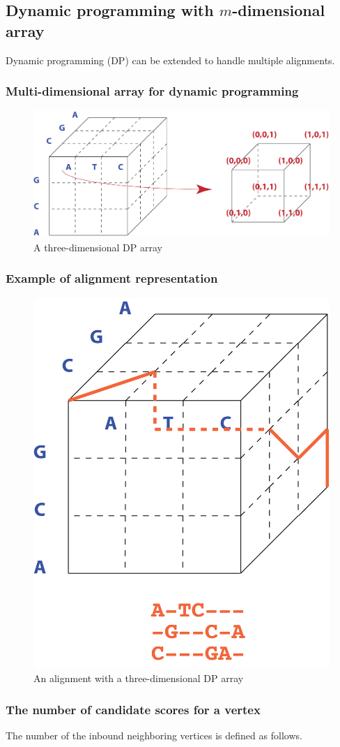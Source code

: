 %
%

%
%
\subsection{Dynamic programming with $m$-dimensional array}
Dynamic programming (DP) can be extended to handle multiple alignments. 

%
%
\subsubsection*{Multi-dimensional array for dynamic programming}
\begin{figure}[H]
  \centering
      \includegraphics[width=0.5 \textwidth]{fig08/dp_mutiple_dimension.png}
  \caption{A three-dimensional DP array}
\end{figure}

%
%
\subsubsection*{Example of alignment representation}
\begin{figure}[H]
  \centering
      \includegraphics[width=0.2 \textwidth]{fig08/alignment_repsentation.png}
  \caption{An alignment with a three-dimensional DP array}
\end{figure}

%
%
\subsubsection*{The number of candidate scores for a vertex }
The number of the inbound neighboring vertices is defined as follows. 

